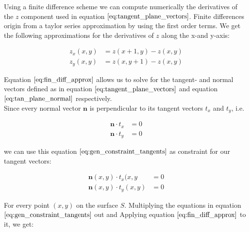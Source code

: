 \documentclass{paper}
\begin{document}
Using a finite difference scheme we can compute numerically the derivatives of the $z$ component used in equation $\ref{eq:tangent_plane_vectors}$. Finite differences origin from a taylor series approximation by using the first order terms. We get the following approximations for the derivatives of $z$ along the x-and y-axis:

\begin{align}
    z_x(x,y) &= z(x+1,y) - z(x,y) \nonumber \\
    z_y(x,y) &= z(x,y+1) - z(x,y)
\label{eq:fin_diff_approx}
\end{align}

Equation $\ref{eq:fin_diff_approx}$ allows us to solve for the tangent- and normal vectors defined as in equation $\ref{eq:tangent_plane_vectors}$ and equation $\ref{eq:tan_plane_normal}$ respectively. \\

Since every normal vector $\textbf{n}$ is perpendicular to its tangent vectors $t_x$ and $t_y$, i.e.

\begin{align}
    \textbf{n} \cdot t_x &= 0 \nonumber \\
    \textbf{n} \cdot t_y &= 0
\label{eq:gen_constraint_tangents}
\end{align}

we can use this equation $\ref{eq:gen_constraint_tangents}$ as constraint for our tangent vectors:

\begin{align}
    \textbf{n}(x,y) \cdot t_x(x,y &= 0 \nonumber \\
    \textbf{n}(x,y) \cdot t_y(x,y) &= 0
\label{eq:gen_constraint_tangents}
\end{align}

For every point $(x,y)$ on the surface $S$. Multiplying the equations in equation $\ref{eq:gen_constraint_tangents}$ out and Applying equation $\ref{eq:fin_diff_approx}$ to it, we get:
\end{document}
